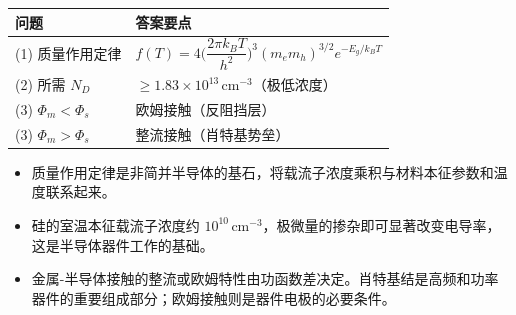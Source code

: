\begin{formulabox}[答案汇总]
\begin{center}
\begin{tabular}{ll}
\toprule
\textbf{问题} & \textbf{答案要点} \\
\midrule
(1) 质量作用定律 & $f(T)=4\bigl(\dfrac{2\pi k_BT}{h^2}\bigr)^3(m_em_h)^{3/2}e^{-E_g/k_BT}$ \\
(2) 所需 $N_D$ & $\ge1.83\times10^{13}\,\text{cm}^{-3}$（极低浓度） \\
(3) $\Phi_m<\Phi_s$ & 欧姆接触（反阻挡层） \\
(3) $\Phi_m>\Phi_s$ & 整流接触（肖特基势垒） \\
\bottomrule
\end{tabular}
\end{center}
\end{formulabox}

\begin{insightbox}[物理图像]
\begin{itemize}
    \item 质量作用定律是非简并半导体的基石，将载流子浓度乘积与材料本征参数和温度联系起来。
    \item 硅的室温本征载流子浓度约 $10^{10}\,\text{cm}^{-3}$，极微量的掺杂即可显著改变电导率，这是半导体器件工作的基础。
    \item 金属-半导体接触的整流或欧姆特性由功函数差决定。肖特基结是高频和功率器件的重要组成部分；欧姆接触则是器件电极的必要条件。
\end{itemize}
\end{insightbox}
